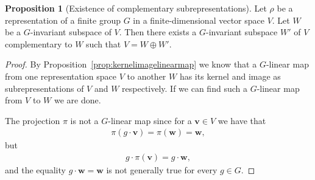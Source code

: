\documentclass[12pt, a4paper, twoside]{article}
\theoremstyle{definition}
\newtheorem{proposition}[definition]{Proposition}
\theoremstyle{remark}
\numberwithin{equation}{section}
\newcommand{\1}{\mathbf{1}}
\newcommand{\0}{\mathbf{0}}
\newcommand{\vvec}{\mathbf{v}}
\newcommand{\wvec}{\mathbf{w}}
\begin{document}
	\begin{proposition}[Existence of complementary subrepresentations]
		Let $\rho$ be a representation of a finite group $G$ in a finite-dimensional vector space $V$. Let $W$ be a $G$-invariant subspace of $V$. Then there exists a $G$-invariant subspace $W'$ of $V$ complementary to $W$ such that $V = W \oplus W'$.
	\end{proposition}
	\begin{proof}
		By Proposition~\ref{prop:kernelimagelinearmap} we know that a $G$-linear map from one representation space $V$ to another $W$ has its kernel and image as subrepresentations of $V$ and $W$ respectively. If we can find such a $G$-linear map from $V$ to $W$ we are done.
		
		The projection $\pi$ is not a $G$-linear map since for a $\vvec \in V$ we have that 
		\begin{align*}
			\pi(g \cdot \vvec) = \pi(\wvec) = \wvec,
		\end{align*}
		but 
		\begin{align*}
			g \cdot \pi(\vvec) = g \cdot \wvec,
		\end{align*}
		and the equality $g \cdot \wvec = \wvec$ is not generally true for every $g \in G$.
		

\end{proof}
\end{document}
